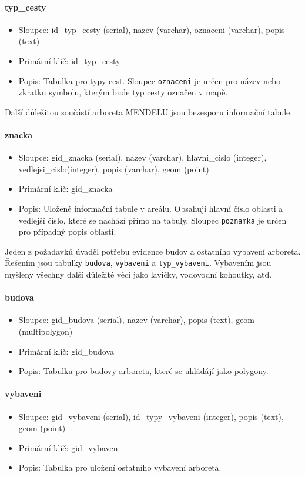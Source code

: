 \documentclass[12pt]{article}%
\begin{document}
{{\paragraph{typ\_cesty}
\begin{itemize}
\item Sloupce: id\_typ\_cesty (serial), nazev (varchar), oznaceni (varchar), popis (text)
\item Primární klíč: id\_typ\_cesty
\item Popis: Tabulka pro typy cest. Sloupec \texttt{oznaceni} je určen pro název nebo zkratku 
symbolu, kterým bude typ cesty označen v mapě.
\end{itemize}

Další důležitou součástí arboreta MENDELU jsou bezesporu informační tabule.
\paragraph{znacka}
\begin{itemize}
\item Sloupce: gid\_znacka (serial), nazev (varchar), hlavni\_cislo (integer), vedlejsi\_cislo(integer), 
popis (varchar), geom (point)
\item Primární klíč: gid\_znacka
\item Popis: Uložené informační tabule v areálu. Obsahují hlavní číslo oblasti a vedlejší číslo, které 
se nachází přímo na tabuly. Sloupec \texttt{poznamka} je určen pro případný popis oblasti.
\end{itemize}

Jeden z požadavků úvaděl potřebu evidence budov a ostatního vybavení arboreta.  Řešením jsou
tabulky \texttt{budova}, \texttt{vybaveni} a \texttt{typ\_vybaveni}. Vybavením jsou myšleny
všechny další důležité věci jako lavičky, vodovodní kohoutky, atd.
\paragraph{budova}
\begin{itemize}
\item Sloupce: gid\_budova (serial), nazev (varchar), popis (text), geom (multipolygon)
\item Primární klíč: gid\_budova
\item Popis: Tabulka pro budovy arboreta, které se ukládájí jako polygony.
\end{itemize}

\paragraph{vybaveni}
\begin{itemize}
\item Sloupce: gid\_vybaveni (serial), id\_typy\_vybaveni (integer), popis (text),
geom (point)
\item Primární klíč: gid\_vybaveni
\item Popis: Tabulka pro uložení ostatního vybavení arboreta.
\end{itemize}

}}
\end{document}

